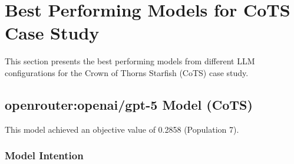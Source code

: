 \section{Best Performing Models for CoTS Case Study}
\label{sec:best_models_cots}
This section presents the best performing models from different LLM configurations for the Crown of Thorns Starfish (CoTS) case study.

\subsection{openrouter:openai/gpt-5 Model (CoTS)}
This model achieved an objective value of 0.2858 (Population 7).

\subsubsection{Model Intention}
